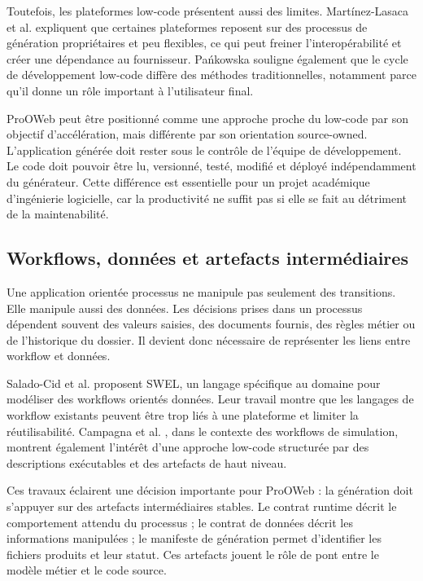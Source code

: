 \documentclass[12pt,a4paper]{article}
\begin{document}
Toutefois, les plateformes low-code présentent aussi des limites. Martínez-Lasaca et al. \cite{martinez2026} expliquent que certaines plateformes reposent sur des processus de génération propriétaires et peu flexibles, ce qui peut freiner l'interopérabilité et créer une dépendance au fournisseur. Pańkowska \cite{pankowska2024} souligne également que le cycle de développement low-code diffère des méthodes traditionnelles, notamment parce qu'il donne un rôle important à l'utilisateur final.

ProOWeb peut être positionné comme une approche proche du low-code par son objectif d'accélération, mais différente par son orientation source-owned. L'application générée doit rester sous le contrôle de l'équipe de développement. Le code doit pouvoir être lu, versionné, testé, modifié et déployé indépendamment du générateur. Cette différence est essentielle pour un projet académique d'ingénierie logicielle, car la productivité ne suffit pas si elle se fait au détriment de la maintenabilité.

\subsection{Workflows, données et artefacts intermédiaires}

Une application orientée processus ne manipule pas seulement des transitions. Elle manipule aussi des données. Les décisions prises dans un processus dépendent souvent des valeurs saisies, des documents fournis, des règles métier ou de l'historique du dossier. Il devient donc nécessaire de représenter les liens entre workflow et données.

Salado-Cid et al. \cite{salado2023} proposent SWEL, un langage spécifique au domaine pour modéliser des workflows orientés données. Leur travail montre que les langages de workflow existants peuvent être trop liés à une plateforme et limiter la réutilisabilité. Campagna et al. \cite{campagna2025}, dans le contexte des workflows de simulation, montrent également l'intérêt d'une approche low-code structurée par des descriptions exécutables et des artefacts de haut niveau.

Ces travaux éclairent une décision importante pour ProOWeb : la génération doit s'appuyer sur des artefacts intermédiaires stables. Le contrat runtime décrit le comportement attendu du processus ; le contrat de données décrit les informations manipulées ; le manifeste de génération permet d'identifier les fichiers produits et leur statut. Ces artefacts jouent le rôle de pont entre le modèle métier et le code source.
\end{document}
